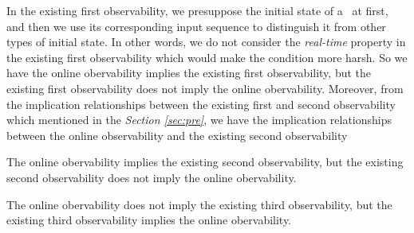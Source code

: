 In the existing first observability, we presuppose the initial state of a \BCN\ at first, and then we use its corresponding input sequence to distinguish it from other types of initial state. In other words, we do not consider the {\em real-time} property in the existing first observability which would make the condition more harsh. So we have the online obervability implies the existing first observability, but the existing first observability does not imply the online obervability. Moreover, from the implication relationships between the existing first and second observability which mentioned in the {\em Section \ref{sec:pre}}, we have the implication relationships between the online observability and the existing second observability
\begin{theorem}
The online obervability implies the existing second observability, but the existing second observability does not imply the online obervability.
\label{theo:4}
\end{theorem}
\begin{theorem}
The online obervability does not imply the existing third observability, but the existing third observability implies the online obervability.
\end{theorem}
